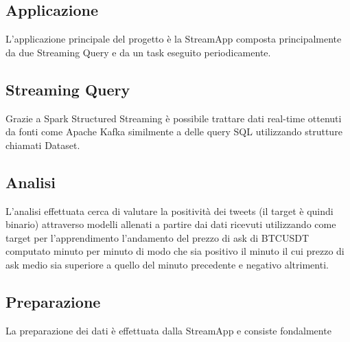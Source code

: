 \subsection{Applicazione}

L'applicazione principale del progetto è la StreamApp composta principalmente da due Streaming
Query e da un task eseguito periodicamente.

\subsection{Streaming Query}

Grazie a Spark Structured Streaming è possibile trattare dati real-time ottenuti da fonti come
Apache Kafka similmente a delle query SQL utilizzando strutture chiamati Dataset. %

\subsection{Analisi}

L'analisi effettuata cerca di valutare la positività dei tweets (il target è quindi binario)
attraverso modelli allenati a partire dai dati ricevuti utilizzando come target per
l'apprendimento l'andamento del prezzo di ask di BTCUSDT computato minuto per minuto di modo
che sia positivo il minuto il cui prezzo di ask medio sia superiore a quello del minuto
precedente e negativo altrimenti.

\subsection{Preparazione}

La preparazione dei dati è effettuata dalla StreamApp e consiste fondalmente 



